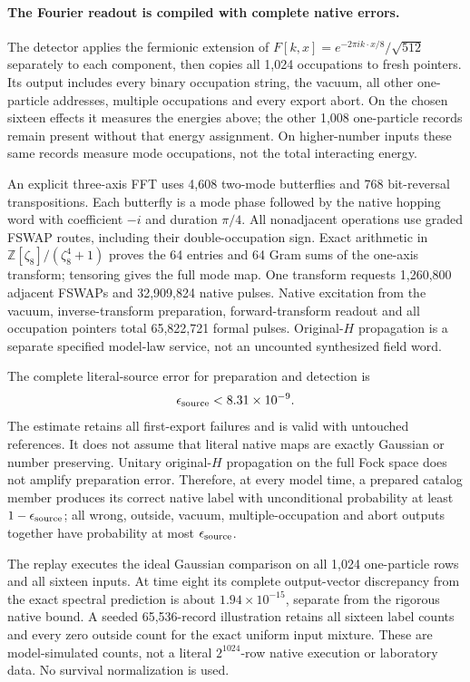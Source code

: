 \paragraph{The Fourier readout is compiled with complete native errors.}
The detector applies the fermionic extension of
$F[k,x]=e^{-2\pi i k\cdot x/8}/\sqrt{512}$ separately to each component,
then copies all 1,024 occupations to fresh pointers.  Its output includes
every binary occupation string, the vacuum, all other one-particle
addresses, multiple occupations and every export abort.  On the chosen
sixteen effects it measures the energies above; the other 1,008
one-particle records remain present without that energy assignment.
On higher-number inputs these same records measure mode occupations,
not the total interacting energy.

An explicit three-axis FFT uses 4,608 two-mode butterflies and 768
bit-reversal transpositions.  Each butterfly is a mode phase followed by
the native hopping word with coefficient $-i$ and duration $\pi/4$.
All nonadjacent operations use graded FSWAP routes, including their
double-occupation sign.  Exact arithmetic in
$\mathbb Z[\zeta_8]/(\zeta_8^4+1)$ proves the 64 entries and 64 Gram
sums of the one-axis transform; tensoring gives the full mode map.
One transform requests 1,260,800 adjacent FSWAPs and 32,909,824 native
pulses.  Native excitation from the vacuum, inverse-transform
preparation, forward-transform readout and all occupation pointers total
65,822,721 formal pulses.  Original-$H$ propagation is a separate
specified model-law service, not an uncounted synthesized field word.

The complete literal-source error for preparation and detection is
\[
 \epsilon_{\rm source}<8.31\times10^{-9}.
\]
The estimate retains all first-export failures and is valid with untouched
references.  It does not assume that literal native maps are exactly
Gaussian or number preserving.  Unitary original-$H$ propagation on the
full Fock space does not amplify preparation error.  Therefore, at every
model time, a prepared catalog member produces its correct native label
with unconditional probability at least $1-\epsilon_{\rm source}$;
all wrong, outside, vacuum, multiple-occupation and abort outputs together
have probability at most $\epsilon_{\rm source}$.

The replay executes the ideal Gaussian comparison on all 1,024
one-particle rows and all sixteen inputs.  At time eight its complete
output-vector discrepancy from the exact spectral prediction is about
$1.94\times10^{-15}$, separate from the rigorous native bound.
A seeded 65,536-record illustration retains all sixteen label counts
and every zero outside count for the exact uniform input mixture.
These are model-simulated counts, not a literal $2^{1024}$-row native
execution or laboratory data.  No survival normalization is used.

